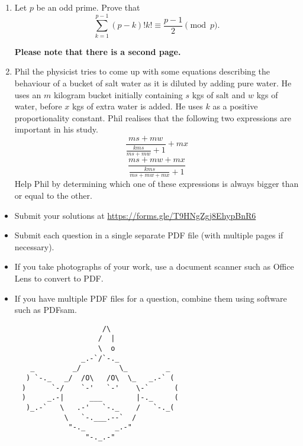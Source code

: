 \documentclass{article}
\begin{document}
\begin{enumerate}[itemsep=\fill]
\item %
Let $p$ be an odd prime. Prove that
\[
	\sum_{k=1}^{p-1} (p-k)!k! \equiv \frac{p-1}{2} \pmod{p}.
\]

\vfill
\begin{center}
  \textbf{Please note that there is a second page.}
\end{center}
\clearpage

\item %
Phil the physicist tries to come up with some equations describing the behaviour of a bucket of salt water as it is diluted by adding pure water. He uses an $m$ kilogram bucket initially containing $s$ kgs of salt and $w$ kgs of water, before $x$ kgs of extra water is added. He uses $k$ as a positive proportionality constant. Phil realises that the following two expressions are important in his study. 
$$\frac{ms+mw}{\frac{kms}{ms+mw}+1} + mx$$
$$\frac{ms+mw+mx}{\frac{kms}{ms+mw+mx}+1}$$
Help Phil by determining which one of these expressions is always bigger than or equal to the other.
\end{enumerate}


\vfill
\begin{itemize}
	\item Submit your solutions at \href{https://forms.gle/T9HNgZgj8EhypBnR6}{https://forms.gle/T9HNgZgj8EhypBnR6}
	\item Submit each question in a single separate PDF file (with multiple pages if necessary).
	\item If you take photographs of your work, use a document scanner such as Office Lens to convert to PDF.
	\item If you have multiple PDF files for a question, combine them using software such as PDFsam.
\end{itemize}

\vfill
\centering
\small
\begin{BVerbatim}
                        /\
                       /  |
                       \  o
                   _.-`/`-._
       _         _/         \_         _
      ) `-._   _/  /O\   /O\  \_   _.-` (
     )      `-/    `-'   `-'    \-`      (
     )     _.-|      ___        |-._     (
      )_.-`   \   .-'   `-._    /   `-._(
               \   `-.___.--`  /
                "-._       _.-"
                    "-._.-"
\end{BVerbatim}
\end{document}
